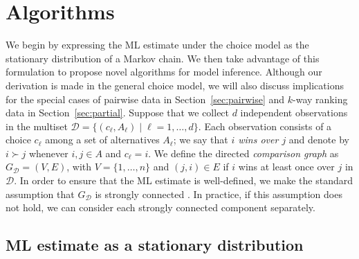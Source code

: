 \section{Algorithms}
\label{sec:algorithms}

We begin by expressing the ML estimate under the choice model as the stationary distribution of a Markov chain.
We then take advantage of this formulation to propose novel algorithms for model inference.
Although our derivation is made in the general choice model, we will also discuss implications for the special cases of pairwise data in Section~\ref{sec:pairwise} and $k$-way ranking data in Section~\ref{sec:partial}.
Suppose that we collect $d$ independent observations in the multiset $\mathcal{D} = \{(c_\ell, A_\ell) \mid \ell = 1, \ldots, d\}$.
Each observation consists of a choice $c_\ell$ among a set of alternatives $A_\ell$;
we say that \emph{$i$ wins over $j$} and denote by $i \succ j$ whenever $i, j \in A$ and $c_\ell = i$.
We define the directed \emph{comparison graph} as $G_{\mathcal{D}} = (V, E)$, with $V = \{1, \ldots, n \}$ and $(j, i) \in E$ if $i$ wins at least once over $j$ in $\mathcal{D}$.
In order to ensure that the ML estimate is well-defined, we make the standard assumption that $G_{\mathcal{D}}$ is strongly connected \citep{ford1957solution, hunter2004mm}.
In practice, if this assumption does not hold, we can consider each strongly connected component separately.

\subsection{ML estimate as a stationary distribution}

